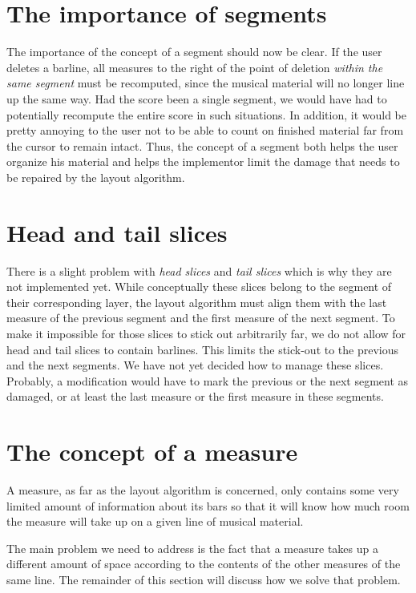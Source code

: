 \section{The importance of segments}

The importance of the concept of a segment should now be clear.
If the user deletes a barline, all measures to the right of the
point of deletion \emph{within the same segment} must be recomputed,
since the musical material will no longer line up the same way.  Had
the score been a single segment, we would have had to potentially
recompute the entire score in such situations.  In addition, it would
be pretty annoying to the user not to be able to count on finished
material far from the cursor to remain intact.  Thus, the concept of a
segment both helps the user organize his material and helps the
implementor limit the damage that needs to be repaired by the layout
algorithm. 

\section{Head and tail slices}

There is a slight problem with \emph{head slices} and \emph{tail
slices} which is why they are not implemented yet.  While
conceptually these slices belong to the segment of their
corresponding layer, the layout algorithm must align them with the
last measure of the previous segment and the first measure of the
next segment.  To make it impossible for those slices to stick out
arbitrarily far, we do not allow for head and tail slices to contain
barlines.  This limits the stick-out to the previous and the
next segments.  We have not yet decided how to manage these slices.
Probably, a modification would have to mark the previous or the next
segment as damaged, or at least the last measure or the first measure
in these segments.  

\section{The concept of a measure}

A measure, as far as the layout algorithm is concerned, only contains
some very limited amount of information about its bars so that it will
know how much room the measure will take up on a given line of musical
material. 

The main problem we need to address is the fact that a measure takes
up a different amount of space according to the contents of the other
measures of the same line.  The remainder of this section will discuss
how we solve that problem.

